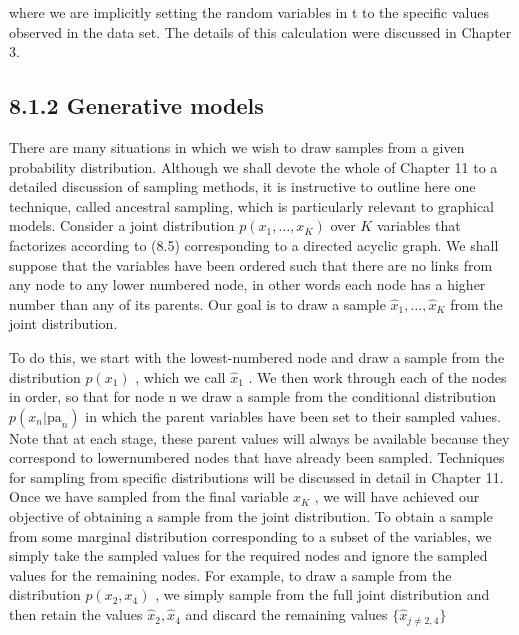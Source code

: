 \documentclass[
  10
]{article}
\begin{document}
where we are implicitly setting the random variables in t to the
specific values observed in the data set. The details of this
calculation were discussed in Chapter 3.

\subsection{8.1.2 Generative models}\label{generative-models}

There are many situations in which we wish to draw samples from a given
probability distribution. Although we shall devote the whole of Chapter
11 to a detailed discussion of sampling methods, it is instructive to
outline here one technique, called ancestral sampling, which is
particularly relevant to graphical models. Consider a joint distribution
\(p ( x _ { 1 } , \ldots , x _ { K } )\) over \(K\) variables that
factorizes according to (8.5) corresponding to a directed acyclic graph.
We shall suppose that the variables have been ordered such that there
are no links from any node to any lower numbered node, in other words
each node has a higher number than any of its parents. Our goal is to
draw a sample
\(\widehat { x } _ { 1 } , \ldots , \widehat { x } _ { K }\) from the
joint distribution.

To do this, we start with the lowest-numbered node and draw a sample
from the distribution \(p ( x _ { 1 } )\) , which we call
\(\widehat { x } _ { 1 }\) . We then work through each of the nodes in
order, so that for node n we draw a sample from the conditional
distribution \(p ( x _ { n } | \mathrm { p a } _ { n } )\) in which the
parent variables have been set to their sampled values. Note that at
each stage, these parent values will always be available because they
correspond to lowernumbered nodes that have already been sampled.
Techniques for sampling from specific distributions will be discussed in
detail in Chapter 11. Once we have sampled from the final variable
\(x _ { K }\) , we will have achieved our objective of obtaining a
sample from the joint distribution. To obtain a sample from some
marginal distribution corresponding to a subset of the variables, we
simply take the sampled values for the required nodes and ignore the
sampled values for the remaining nodes. For example, to draw a sample
from the distribution \(p ( x _ { 2 } , x _ { 4 } )\) , we simply sample
from the full joint distribution and then retain the values
\(\widehat { x } _ { 2 } , \widehat { x } _ { 4 }\) and discard the
remaining values \(\{ \widehat { x } _ { j \neq 2 , 4 } \}\)
\end{document}
